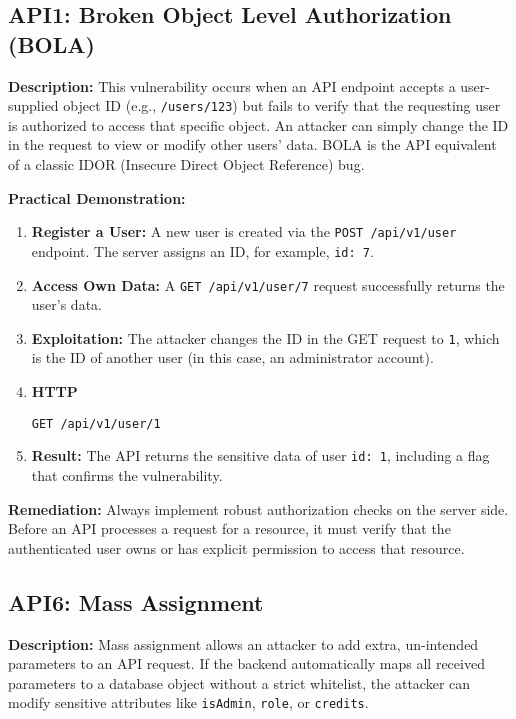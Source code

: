 \documentclass[12pt]{article}
\begin{document}
\subsection*{API1: Broken Object Level Authorization (BOLA)}
\textbf{Description:} This vulnerability occurs when an API endpoint accepts a user-supplied object
ID (e.g., \texttt{/users/123}) but fails to verify that the requesting user is authorized to access that
specific object. An attacker can simply change the ID in the request to view or modify other
users' data. BOLA is the API equivalent of a classic IDOR (Insecure Direct Object Reference)
bug.

\textbf{Practical Demonstration:}
\begin{enumerate}
  \item \textbf{Register a User:} A new user is created via the \texttt{POST /api/v1/user} endpoint. The server
  assigns an ID, for example, \texttt{id: 7}.
  \item \textbf{Access Own Data:} A \texttt{GET /api/v1/user/7} request successfully returns the user's data.
  \item \textbf{Exploitation:} The attacker changes the ID in the GET request to \texttt{1}, which is the ID of
  another user (in this case, an administrator account).
  \item \textbf{HTTP}
  \begin{lstlisting}
GET /api/v1/user/1
  \end{lstlisting}
  \item \textbf{Result:} The API returns the sensitive data of user \texttt{id: 1}, including a flag that confirms
  the vulnerability.
\end{enumerate}

\textbf{Remediation:} Always implement robust authorization checks on the server side. Before an
API processes a request for a resource, it must verify that the authenticated user owns or has
explicit permission to access that resource.

\subsection*{API6: Mass Assignment}
\textbf{Description:} Mass assignment allows an attacker to add extra, un-intended parameters to an
API request. If the backend automatically maps all received parameters to a database object
without a strict whitelist, the attacker can modify sensitive attributes like \texttt{isAdmin}, \texttt{role}, or
\texttt{credits}.
\end{document}
